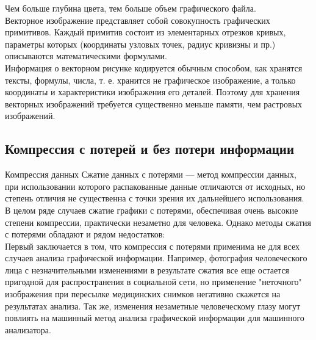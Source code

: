 \documentclass{beamer}
\begin{document}
Чем больше глубина цвета, тем больше объем графического файла.\\
\newpage
Векторное изображение представляет собой совокупность графических примитивов. Каждый примитив состоит из элементарных отрезков кривых, параметры которых (координаты узловых точек, радиус кривизны и пр.) описываются математическими формулами.\\
Информация о векторном рисунке кодируется обычным способом, как хранятся тексты, формулы, числа, т. е. хранится не графическое изображение, а только координаты и характеристики изображения его деталей. Поэтому для хранения векторных изображений требуется существенно меньше памяти, чем растровых изображений.\\
\newpage
    \subsection{Компрессия с потерей и без потери информации}
    \begin{frame}{Компрессия данных}
Сжатие данных с потерями — метод компрессии данных, при использовании которого распакованные данные отличаются от исходных, но степень отличия не существенна с точки зрения их дальнейшего использования.\\
В целом ряде случаев сжатие графики с потерями, обеспечивая очень высокие степени компрессии, практически незаметно для человека. Однако методы сжатия с потерями обладают и рядом недостатков:\\
Первый заключается в том, что компрессия с потерями применима не для всех случаев анализа графической информации. Например, фотография человеческого лица с незначительными изменениями в результате сжатия все еще остается пригодной для распространения в социальной сети, но применение "неточного" изображения при пересылке медицинских снимков негативно скажется на результатах анализа. Так же, изменения незаметные человеческому глазу могут повлиять на машинный метод анализа графической информации для машинного анализатора.\\
\begin{figure}[H]
\begin{center}
\begin{minipage}[h]{1\linewidth}
  \\
\end{minipage}
\end{center}
\end{figure}
\end{frame}
\end{document}
